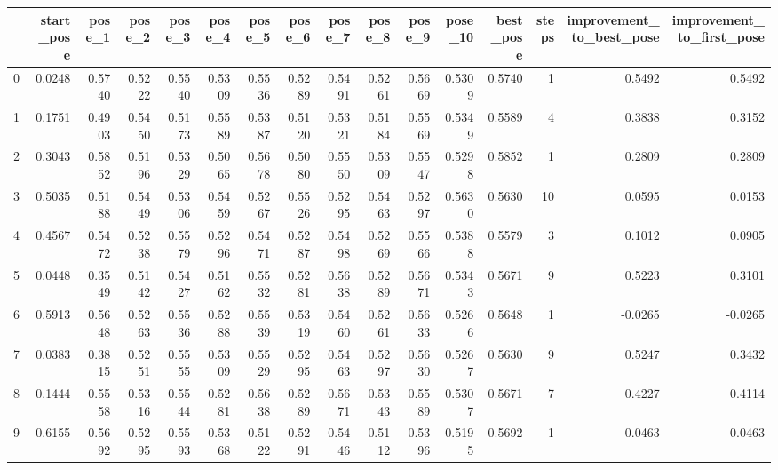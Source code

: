 \begin{tabular}{lrrrrrrrrrrrrrrr}
\toprule
{} &  start\_pose &  pose\_1 &  pose\_2 &  pose\_3 &  pose\_4 &  pose\_5 &  pose\_6 &  pose\_7 &  pose\_8 &  pose\_9 &  pose\_10 &  best\_pose &  steps &  improvement\_to\_best\_pose &  improvement\_to\_first\_pose \\
\midrule
0  &      0.0248 &  0.5740 &  0.5222 &  0.5540 &  0.5309 &  0.5536 &  0.5289 &  0.5491 &  0.5261 &  0.5669 &   0.5309 &     0.5740 &      1 &                    0.5492 &                     0.5492 \\
1  &      0.1751 &  0.4903 &  0.5450 &  0.5173 &  0.5589 &  0.5387 &  0.5120 &  0.5321 &  0.5184 &  0.5569 &   0.5349 &     0.5589 &      4 &                    0.3838 &                     0.3152 \\
2  &      0.3043 &  0.5852 &  0.5196 &  0.5329 &  0.5065 &  0.5678 &  0.5080 &  0.5550 &  0.5309 &  0.5547 &   0.5298 &     0.5852 &      1 &                    0.2809 &                     0.2809 \\
3  &      0.5035 &  0.5188 &  0.5449 &  0.5306 &  0.5459 &  0.5267 &  0.5526 &  0.5295 &  0.5463 &  0.5297 &   0.5630 &     0.5630 &     10 &                    0.0595 &                     0.0153 \\
4  &      0.4567 &  0.5472 &  0.5238 &  0.5579 &  0.5296 &  0.5471 &  0.5287 &  0.5498 &  0.5269 &  0.5566 &   0.5388 &     0.5579 &      3 &                    0.1012 &                     0.0905 \\
5  &      0.0448 &  0.3549 &  0.5142 &  0.5427 &  0.5162 &  0.5532 &  0.5281 &  0.5638 &  0.5289 &  0.5671 &   0.5343 &     0.5671 &      9 &                    0.5223 &                     0.3101 \\
6  &      0.5913 &  0.5648 &  0.5263 &  0.5536 &  0.5288 &  0.5539 &  0.5319 &  0.5460 &  0.5261 &  0.5633 &   0.5266 &     0.5648 &      1 &                   -0.0265 &                    -0.0265 \\
7  &      0.0383 &  0.3815 &  0.5251 &  0.5555 &  0.5309 &  0.5529 &  0.5295 &  0.5463 &  0.5297 &  0.5630 &   0.5267 &     0.5630 &      9 &                    0.5247 &                     0.3432 \\
8  &      0.1444 &  0.5558 &  0.5316 &  0.5544 &  0.5281 &  0.5638 &  0.5289 &  0.5671 &  0.5343 &  0.5589 &   0.5307 &     0.5671 &      7 &                    0.4227 &                     0.4114 \\
9  &      0.6155 &  0.5692 &  0.5295 &  0.5593 &  0.5368 &  0.5122 &  0.5291 &  0.5446 &  0.5112 &  0.5396 &   0.5195 &     0.5692 &      1 &                   -0.0463 &                    -0.0463 \\

\end{tabular}
